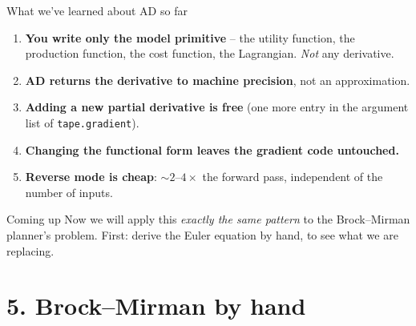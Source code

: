 \documentclass[aspectratio=169,11pt]{beamer}
\begin{document}
\begin{frame}{What we've learned about AD so far}
\small
\begin{enumerate}\itemsep4pt
\item \textbf{You write only the model primitive} -- the utility function, the production function, the cost function, the Lagrangian. \emph{Not} any derivative.
\item \textbf{AD returns the derivative to machine precision}, not an approximation.
\item \textbf{Adding a new partial derivative is free} (one more entry in the argument list of \texttt{tape.gradient}).
\item \textbf{Changing the functional form leaves the gradient code untouched.}
\item \textbf{Reverse mode is cheap}: $\sim 2\text{--}4\times$ the forward pass, independent of the number of inputs.
\end{enumerate}
\vspace{8pt}
\begin{exampleblock}{Coming up}
\small Now we will apply this \emph{exactly the same pattern} to the Brock--Mirman planner's problem. First: derive the Euler equation by hand, to see what we are replacing.
\end{exampleblock}
\end{frame}


\section*{5. Brock--Mirman by hand}
\end{document}
